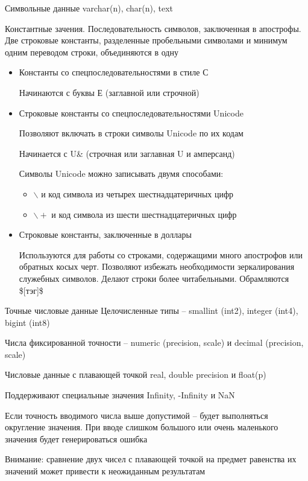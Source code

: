 \documentclass[12pt]{article}
\begin{document}
\begin{defin}{Символьные данные}
    varchar(n), char(n), text 

    Константные зачения. Последовательность символов, заключенная в апострофы. Две строковые константы, разделенные пробельными символами и минимум одним переводом строки, объединяются в одну 

    \begin{itemize}
        \item Константы со спецпоследовательностями в стиле С 
        
        Начинаются с буквы Е (заглавной или строчной)

        \item Строковые константы со спецпоследовательностями Unicode 
        
        Позволяют включать в строки символы Unicode по их кодам 

        Начинается с U\& (строчная или заглавная U и амперсанд)

        Символы Unicode можно записывать двумя способами:

        \begin{itemize}
            \item $\backslash$ и код символа из четырех шестнадцатеричных цифр 
            \item $\backslash+$ и код символа из шести шестнадцатеричных цифр
        \end{itemize}

        \item Строковые константы, заключенные в доллары 
        
        Используются для работы со строками, содержащими много апострофов или обратных косых черт. Позволяют избежать необходимости зеркалирования служебных символов. Делают строки более читабельными. Обрамляются \$[тэг]\$
    \end{itemize}
\end{defin}

\begin{defin}{Точные числовые данные}
    Целочисленные типы -- smallint (int2), integer (int4), bigint (int8)

    Числа фиксированной точности -- numeric (precision, scale) и decimal (precision, scale)
\end{defin}

\begin{defin}{Числовые данные с плавающей точкой}
    real, double precision и float(p)

    Поддерживают специальные значения Infinity, -Infinity и NaN

    Если точность вводимого числа выше допустимой -- будет выполняться округление значения. При вводе слишком большого или очень маленького значения будет генерироваться ошибка 

    Внимание: сравнение двух чисел с плавающей точкой на предмет равенства их значений может привести к неожиданным результатам 
\end{defin}
\end{document}
